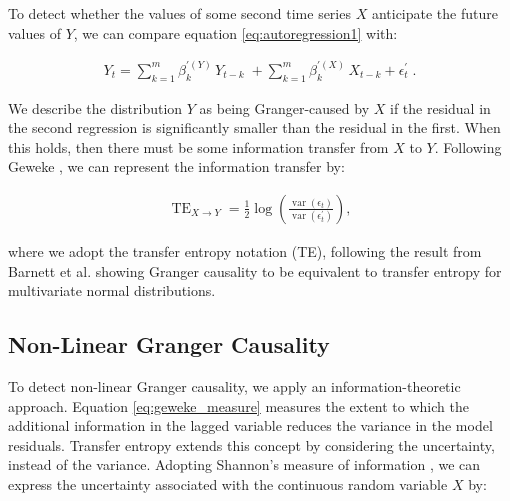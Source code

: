 \documentclass[]{rsos}%
\begin{document}
  To detect whether the values of some second time series $X$ anticipate the future values of $Y$, we can compare equation \ref{eq:autoregression1}  with: 

  \begin{eqnarray}
    \label{eq:autoregression2}
  Y_t = \sum_{k=1}^m \beta_{k}^{\prime(Y)} \, Y_{t-k}  \; + 
        \sum_{k=1}^m \beta_{k}^{\prime(X)} \, X_{t-k} 
  + \epsilon^{\prime}_t \;.
  \end{eqnarray}

We describe the distribution $Y$ as being Granger-caused by $X$ if the residual in the second regression is significantly smaller than the residual in the first. When this holds, then there must be some information transfer from $X$ to $Y$. Following Geweke \cite{geweke1984measures}, we can represent the information transfer by:

  \begin{eqnarray}
    \label{eq:geweke_measure}
    \operatorname{TE}_{X\rightarrow Y} = \frac12\log \left(
      \frac{\operatorname{var}(\epsilon_t)}
          {\operatorname{var}(\epsilon^{\prime}_t)}
  \right) ,
  \end{eqnarray}

    where we adopt the transfer entropy notation (TE), following the result from Barnett et al. \cite{barnett2009granger} showing Granger causality to be equivalent to transfer entropy for multivariate normal distributions.

  \subsection{Non-Linear Granger Causality}

  To detect non-linear Granger causality, we apply an information-theoretic approach. Equation \ref{eq:geweke_measure} measures the extent to which the additional information in the lagged variable reduces the variance in the model residuals. Transfer entropy extends this concept by considering the uncertainty, instead of the variance. Adopting Shannon's measure of information \cite{shannon1948}, we can express the uncertainty associated with the continuous random variable $X$ by:
\end{document}
